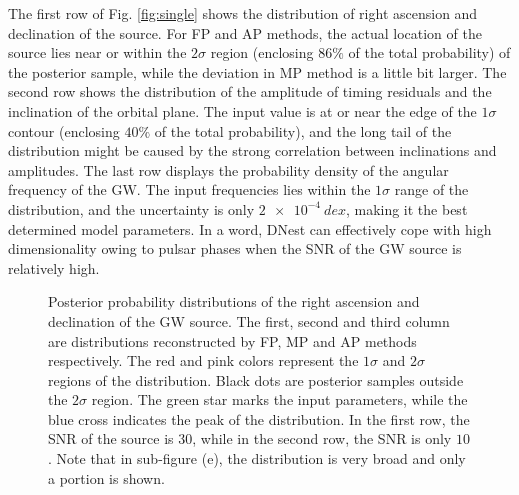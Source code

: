 \documentclass[times,tight]{aastex631}
\begin{document}
The first row of Fig. \ref{fig:single} shows the distribution of right ascension and declination of the source.
For FP and AP methods, the actual location of the source lies near or within the $2\sigma$ region (enclosing $86\%$ of the total probability) of the posterior sample, while the deviation in MP method is a little bit larger.
The second row shows the distribution of the amplitude of timing residuals and the inclination of the orbital plane.
The input value is at or near the edge of the $1\sigma$ contour (enclosing $40\%$ of the total probability), and the long tail of the distribution might be caused by the strong correlation between inclinations and amplitudes.
The last row displays the probability density of the angular frequency of the GW.
The input frequencies lies within the $1\sigma$ range of the distribution, and the uncertainty is only $\SI{2e-4}{dex}$, making it the best determined model parameters.
In a word, DNest can effectively cope with high dimensionality owing to pulsar phases when the SNR of the GW source is relatively high.

\begin{figure}
    \caption{Posterior probability distributions of the right ascension and declination of the GW source.
    The first, second and third column are distributions reconstructed by FP, MP and AP methods respectively.
    The red and pink colors represent the $1\sigma$ and $2\sigma$ regions of the distribution.
    Black dots are posterior samples outside the $2\sigma$ region.
    The green star marks the input parameters, while the blue cross indicates the peak of the distribution.
    In the first row, the SNR of the source is $30$, while in the second row, the SNR is only $10$.
    Note that in sub-figure (e), the distribution is very broad and only a portion is shown.
    \label{fig:weak}}
\end{figure}
\end{document}
